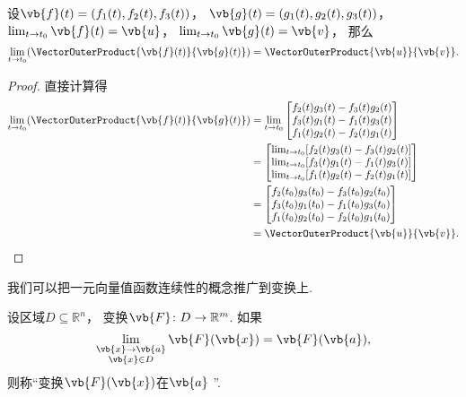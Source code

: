 \begin{theorem}
设\(\vb{f}(t) = (f_1(t),f_2(t),f_3(t))\)，
\(\vb{g}(t) = (g_1(t),g_2(t),g_3(t))\)，
\(\lim_{t \to t_0} \vb{f}(t) = \vb{u}\)，
\(\lim_{t \to t_0} \vb{g}(t) = \vb{v}\)，
那么\begin{equation*}
	\lim_{t \to t_0} (\VectorOuterProduct{\vb{f}(t)}{\vb{g}(t)})
	= \VectorOuterProduct{\vb{u}}{\vb{v}}.
\end{equation*}
\begin{proof}
直接计算得\begin{align*}
	\lim_{t \to t_0} (\VectorOuterProduct{\vb{f}(t)}{\vb{g}(t)})
	&= \lim_{t \to t_0} \begin{bmatrix}
		f_2(t) g_3(t) - f_3(t) g_2(t) \\
		f_3(t) g_1(t) - f_1(t) g_3(t) \\
		f_1(t) g_2(t) - f_2(t) g_1(t) \\
	\end{bmatrix} \\
	&= \begin{bmatrix}
		\lim_{t \to t_0} [f_2(t) g_3(t) - f_3(t) g_2(t)] \\
		\lim_{t \to t_0} [f_3(t) g_1(t) - f_1(t) g_3(t)] \\
		\lim_{t \to t_0} [f_1(t) g_2(t) - f_2(t) g_1(t)] \\
	\end{bmatrix} \\
	&= \begin{bmatrix}
		f_2(t_0) g_3(t_0) - f_3(t_0) g_2(t_0) \\
		f_3(t_0) g_1(t_0) - f_1(t_0) g_3(t_0) \\
		f_1(t_0) g_2(t_0) - f_2(t_0) g_1(t_0) \\
	\end{bmatrix} \\
	&= \VectorOuterProduct{\vb{u}}{\vb{v}}.
	\qedhere
\end{align*}
\end{proof}
\end{theorem}

我们可以把一元向量值函数连续性的概念推广到变换上.
\begin{definition}
设区域\(D \subseteq \mathbb{R}^n\)，
变换\(\vb{F}\colon D \to \mathbb{R}^m\).
如果\begin{equation*}
	\lim_{\substack{
		\vb{x}\to\vb{a} \\
		\vb{x} \in D
	}} \vb{F}(\vb{x})
	= \vb{F}(\vb{a}),
\end{equation*}
则称“变换\(\vb{F}(\vb{x})\)在\(\vb{a}\) ”.
\end{definition}

